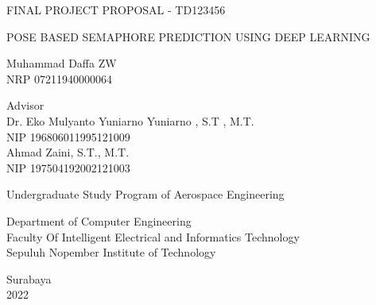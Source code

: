 \begin{large}
  FINAL PROJECT PROPOSAL - TD123456
\end{large}

\vspace{\fill}

\begin{spacing}{1.5}
  \begin{Large}
    POSE BASED SEMAPHORE PREDICTION USING DEEP LEARNING
  \end{Large}
\end{spacing}

\vspace{\fill}

\begin{large}
  Muhammad Daffa ZW \\
  \textnormal{NRP 07211940000064}
\end{large}

\vspace{\fill}

\begin{large}
  \textnormal{Advisor} \\
  Dr. Eko Mulyanto Yuniarno Yuniarno , S.T , M.T. \\
  \textnormal{NIP 196806011995121009} \\
  Ahmad Zaini, S.T., M.T. \\
  \textnormal{NIP 197504192002121003}
\end{large}

\vspace{\fill}

Undergraduate Study Program of Aerospace Engineering \\

\normalfont

Department of Computer Engineering \\
Faculty Of Intelligent Electrical and Informatics Technology \\
Sepuluh Nopember Institute of Technology

Surabaya \\
2022

